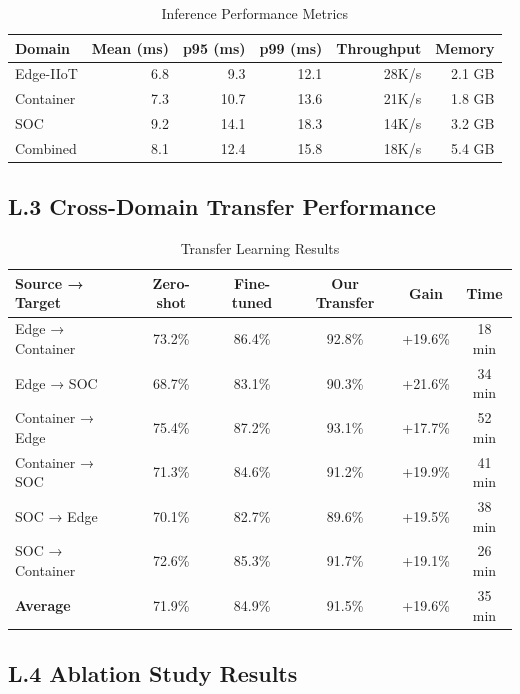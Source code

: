 \documentclass[12pt]{article}
\begin{document}
\begin{table}[H]
\centering
\caption{Inference Performance Metrics}
\begin{tabular}{lrrrrr}
\toprule
\textbf{Domain} & \textbf{Mean (ms)} & \textbf{p95 (ms)} & \textbf{p99 (ms)} & \textbf{Throughput} & \textbf{Memory} \\
\midrule
Edge-IIoT & 6.8 & 9.3 & 12.1 & 28K/s & 2.1 GB \\
Container & 7.3 & 10.7 & 13.6 & 21K/s & 1.8 GB \\
SOC & 9.2 & 14.1 & 18.3 & 14K/s & 3.2 GB \\
Combined & 8.1 & 12.4 & 15.8 & 18K/s & 5.4 GB \\
\bottomrule
\end{tabular}
\end{table}

\subsection{L.3 Cross-Domain Transfer Performance}

\begin{table}[H]
\centering
\caption{Transfer Learning Results}
\begin{tabular}{lccccc}
\toprule
\textbf{Source → Target} & \textbf{Zero-shot} & \textbf{Fine-tuned} & \textbf{Our Transfer} & \textbf{Gain} & \textbf{Time} \\
\midrule
Edge → Container & 73.2\% & 86.4\% & 92.8\% & +19.6\% & 18 min \\
Edge → SOC & 68.7\% & 83.1\% & 90.3\% & +21.6\% & 34 min \\
Container → Edge & 75.4\% & 87.2\% & 93.1\% & +17.7\% & 52 min \\
Container → SOC & 71.3\% & 84.6\% & 91.2\% & +19.9\% & 41 min \\
SOC → Edge & 70.1\% & 82.7\% & 89.6\% & +19.5\% & 38 min \\
SOC → Container & 72.6\% & 85.3\% & 91.7\% & +19.1\% & 26 min \\
\midrule
\textbf{Average} & 71.9\% & 84.9\% & 91.5\% & +19.6\% & 35 min \\
\bottomrule
\end{tabular}
\end{table}

\subsection{L.4 Ablation Study Results}
\end{document}
